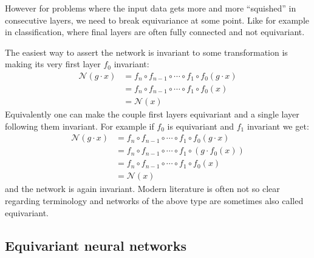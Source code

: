         However for problems where the input data gets more and more ``squished'' in consecutive layers,
        we need to break equivariance at some point. Like for example in classification,
        where final layers are often fully connected and not equivariant. \par
        The easiest way to assert the network is invariant to some transformation
        is making its very first layer $f_0$ invariant:
        \begin{align*}
            \mathcal{N}(g\cdot x)
            &= f_n \circ f_{n-1} \circ \cdots \circ f_1 \circ f_0(g\cdot x)  \\
            &= f_n \circ f_{n-1} \circ \cdots \circ f_1 \circ f_0(x) \\
            &= \mathcal{N}(x)
        \end{align*}
        Equivalently \cite{lie_transformer}
        one can make the couple first layers equivariant and a single layer
        following them invariant. For example if $f_0$ is equivariant and $f_1$ invariant we get:
        \begin{align*}
            \mathcal{N}(g\cdot x)
            &= f_n \circ f_{n-1} \circ \cdots \circ f_1 \circ f_0(g\cdot x)  \\
            &= f_n \circ f_{n-1} \circ \cdots \circ f_1 \circ \left( g \cdot f_0(x) \right) \\
            &= f_n \circ f_{n-1} \circ \cdots \circ f_1 \circ f_0(x) \\
            &= \mathcal{N}(x)
        \end{align*}
        and the network is again invariant. Modern literature is often not so
        clear regarding terminology and networks of the above type are sometimes
        also called equivariant.

\subsection{Equivariant neural networks}
